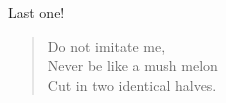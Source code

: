 \documentclass[xcolor={usenames,svgnames,x11names,dvipsnames,table}]{beamer}
\begin{document}
\begin{frame}{Last one!}
\vspace{1cm}
\begin{quote}
\centering
Do not imitate me, \\
Never be like a mush melon \\
Cut in two identical halves. \\
\end{quote}

\end{frame}



%
\end{document}
